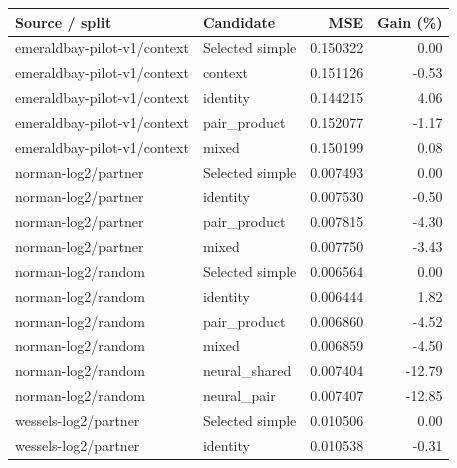 \begin{table}[htbp]\centering\small\begin{tabular}{llrr}\toprule

Source / split & Candidate & MSE & Gain (\%)\\\midrule

emeraldbay-pilot-v1/context & Selected simple & 0.150322 & 0.00\\

emeraldbay-pilot-v1/context & context & 0.151126 & -0.53\\

emeraldbay-pilot-v1/context & identity & 0.144215 & 4.06\\

emeraldbay-pilot-v1/context & pair\_product & 0.152077 & -1.17\\

emeraldbay-pilot-v1/context & mixed & 0.150199 & 0.08\\

norman-log2/partner & Selected simple & 0.007493 & 0.00\\

norman-log2/partner & identity & 0.007530 & -0.50\\

norman-log2/partner & pair\_product & 0.007815 & -4.30\\

norman-log2/partner & mixed & 0.007750 & -3.43\\

norman-log2/random & Selected simple & 0.006564 & 0.00\\

norman-log2/random & identity & 0.006444 & 1.82\\

norman-log2/random & pair\_product & 0.006860 & -4.52\\

norman-log2/random & mixed & 0.006859 & -4.50\\

norman-log2/random & neural\_shared & 0.007404 & -12.79\\

norman-log2/random & neural\_pair & 0.007407 & -12.85\\

wessels-log2/partner & Selected simple & 0.010506 & 0.00\\

wessels-log2/partner & identity & 0.010538 & -0.31\\


\end{tabular}
\end{table}
